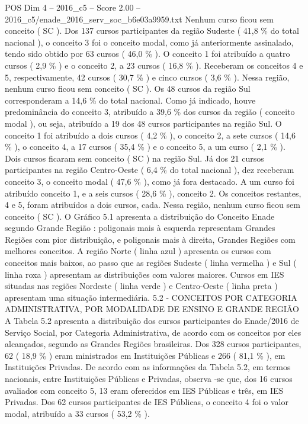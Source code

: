\begin{textsample}{POS Dim 4 – 2016\_c5 – Score 2.00 – 2016\_c5/enade\_2016\_serv\_soc\_b6e03a9959.txt}
Nenhum curso ficou sem conceito ( SC ).
Dos 137 cursos participantes da região Sudeste ( 41,8 \% do total nacional ), o conceito 3 foi o conceito modal, como já anteriormente assinalado, tendo sido obtido por 63 cursos ( 46,0 \% ).
O conceito 1 foi atribuído a quatro cursos ( 2,9 \% ) e o conceito 2, a 23 cursos ( 16,8 \% ).
Receberam os conceitos 4 e 5, respectivamente, 42 cursos ( 30,7 \% ) e cinco cursos ( 3,6 \% ).
Nessa região, nenhum curso ficou sem conceito ( SC ).
Os 48 cursos da região Sul corresponderam a 14,6 \% do total nacional.
Como já indicado, houve predominância do conceito 3, atribuído a 39,6 \% dos cursos da região ( conceito modal ), ou seja, atribuído a 19 dos 48 cursos participantes na região Sul.
O conceito 1 foi atribuído a dois cursos ( 4,2 \% ), o conceito 2, a sete cursos ( 14,6 \% ), o conceito 4, a 17 cursos ( 35,4 \% ) e o conceito 5, a um curso ( 2,1 \% ).
Dois cursos ficaram sem conceito ( SC ) na região Sul.
Já dos 21 cursos participantes na região Centro-Oeste ( 6,4 \% do total nacional ), dez receberam conceito 3, o conceito modal ( 47,6 \% ), como já fora destacado.
A um curso foi atribuído conceito 1, e a seis cursos ( 28,6 \% ), conceito 2.
Os conceitos restantes, 4 e 5, foram atribuídos a dois cursos, cada.
Nessa região, nenhum curso ficou sem conceito ( SC ).
O Gráfico 5.1 apresenta a distribuição do Conceito Enade segundo Grande Região : poligonais mais à esquerda representam Grandes Regiões com pior distribuição, e poligonais mais à direita, Grandes Regiões com melhores conceitos.
A região Norte ( linha azul ) apresenta os cursos com conceitos mais baixos, ao passo que as regiões Sudeste ( linha vermelha ) e Sul ( linha roxa ) apresentam as distribuições com valores maiores.
Cursos em IES situadas nas regiões Nordeste ( linha verde ) e Centro-Oeste ( linha preta ) apresentam uma situação intermediária. 5.2 - CONCEITOS POR CATEGORIA ADMINISTRATIVA, POR MODALIDADE DE ENSINO E GRANDE REGIÃO A Tabela 5.2 apresenta a distribuição dos cursos participantes do Enade/2016 de Serviço Social, por Categoria Administrativa, de acordo com os conceitos por eles alcançados, segundo as Grandes Regiões brasileiras.
Dos 328 cursos participantes, 62 ( 18,9 \% ) eram ministrados em Instituições Públicas e 266 ( 81,1 \% ), em Instituições Privadas.
De acordo com as informações da Tabela 5.2, em termos nacionais, entre Instituições Públicas e Privadas, observa -se que, dos 16 cursos avaliados com conceito 5, 13 eram oferecidos em IES Públicas e três, em IES Privadas.
Dos 62 cursos participantes de IES Públicas, o conceito 4 foi o valor modal, atribuído a 33 cursos ( 53,2 \% ).

\end{textsample}
